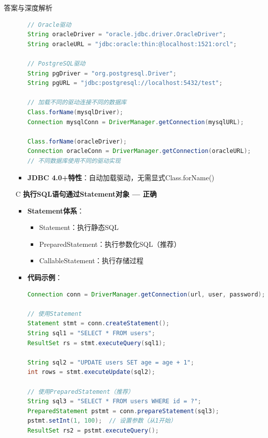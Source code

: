 \documentclass[12pt, a4paper]{ctexart}
\begin{document}
\begin{enumerate}[label=\textbf{\arabic*.}]
\begin{bluebox}{答案与深度解析}
\begin{itemize}[leftmargin=*, nosep, label={}]
\begin{itemize}[label={}, leftmargin=*, nosep]
\begin{lstlisting}[language=Java]
// Oracle驱动
String oracleDriver = "oracle.jdbc.driver.OracleDriver";
String oracleURL = "jdbc:oracle:thin:@localhost:1521:orcl";

// PostgreSQL驱动
String pgDriver = "org.postgresql.Driver";
String pgURL = "jdbc:postgresql://localhost:5432/test";

// 加载不同的驱动连接不同的数据库
Class.forName(mysqlDriver);
Connection mysqlConn = DriverManager.getConnection(mysqlURL);

Class.forName(oracleDriver);
Connection oracleConn = DriverManager.getConnection(oracleURL);
// 不同数据库使用不同的驱动实现
				      \end{lstlisting}
				            \item \textbf{JDBC 4.0+特性}：自动加载驱动，无需显式Class.forName()
			            \end{itemize}

			      \item[C] \textbf{执行SQL语句通过Statement对象 — 正确}
			            \begin{itemize}[label={}, leftmargin=*, nosep]
				            \item \textbf{Statement体系}：
				                  \begin{itemize}[label={}, nosep]
					                  \item Statement：执行静态SQL
					                  \item PreparedStatement：执行参数化SQL（推荐）
					                  \item CallableStatement：执行存储过程
				                  \end{itemize}
				            \item \textbf{代码示例}：
				                  \begin{lstlisting}[language=Java]
Connection conn = DriverManager.getConnection(url, user, password);

// 使用Statement
Statement stmt = conn.createStatement();
String sql1 = "SELECT * FROM users";
ResultSet rs = stmt.executeQuery(sql1);

String sql2 = "UPDATE users SET age = age + 1";
int rows = stmt.executeUpdate(sql2);

// 使用PreparedStatement（推荐）
String sql3 = "SELECT * FROM users WHERE id = ?";
PreparedStatement pstmt = conn.prepareStatement(sql3);
pstmt.setInt(1, 100);  // 设置参数（从1开始）
ResultSet rs2 = pstmt.executeQuery();


\end{lstlisting}
\end{itemize}
\end{itemize}
\end{bluebox}
\end{enumerate}
\end{document}

